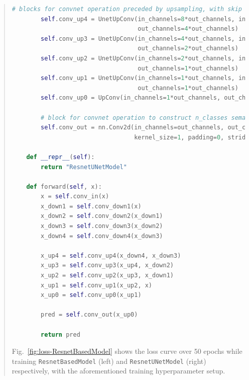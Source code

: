 \documentclass[11pt]{article}
\begin{document}
\begin{quote}
\begin{lstlisting}[language=Python, basicstyle=\scriptsize]
        # blocks for convnet operation preceded by upsampling, with skip connection
        self.conv_up4 = UnetUpConv(in_channels=8*out_channels, in_channels_skip=4*out_channels, 
                                   out_channels=4*out_channels)     
        self.conv_up3 = UnetUpConv(in_channels=4*out_channels, in_channels_skip=2*out_channels, 
                                   out_channels=2*out_channels)     
        self.conv_up2 = UnetUpConv(in_channels=2*out_channels, in_channels_skip=1*out_channels, 
                                   out_channels=1*out_channels)     
        self.conv_up1 = UnetUpConv(in_channels=1*out_channels, in_channels_skip=1*out_channels, 
                                   out_channels=1*out_channels)
        self.conv_up0 = UpConv(in_channels=1*out_channels, out_channels=1*out_channels)       

        # block for convnet operation to construct n_classes semantic outputs
        self.conv_out = nn.Conv2d(in_channels=out_channels, out_channels=n_classes, 
                                  kernel_size=1, padding=0, stride=1)
    
    def __repr__(self):
        return "ResnetUNetModel"        

    def forward(self, x):
        x = self.conv_in(x)
        x_down1 = self.conv_down1(x)
        x_down2 = self.conv_down2(x_down1)
        x_down3 = self.conv_down3(x_down2)
        x_down4 = self.conv_down4(x_down3)

        x_up4 = self.conv_up4(x_down4, x_down3)
        x_up3 = self.conv_up3(x_up4, x_down2)
        x_up2 = self.conv_up2(x_up3, x_down1)
        x_up1 = self.conv_up1(x_up2, x)
        x_up0 = self.conv_up0(x_up1)

        pred = self.conv_out(x_up0)

        return pred
\end{lstlisting}


Fig.~\ref{fig:loss-ResnetBasedModel} shows the loss curve over 50 epochs while training \texttt{ResnetBasedModel} (left) and \texttt{ResnetUNetModel} (right) respectively, with the aforementioned training hyperparameter setup. 


\end{quote}
\end{document}
